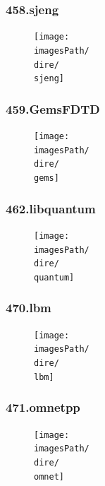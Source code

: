 \documentclass[12pt,a4paper]{article}
\newcommand{\imagesPath}{/home/nick/arch-ntua/ex02/graphs}
\newcommand{\sjeng}{458.sjeng.cslab_branch_predictors.out.pdf}
\newcommand{\gems}{459.GemsFDTD.cslab_branch_predictors.out.pdf}
\newcommand{\quantum}{462.libquantum.cslab_branch_predictors.out.pdf}
\newcommand{\lbm}{470.lbm.cslab_branch_predictors.out.pdf}
\newcommand{\omnet}{471.omnetpp.cslab_branch_predictors.out.pdf}
\newcommand{\dire}{4.5}
\begin{document}
		\subsubsection{458.sjeng}
			\begin{figure}[H]
				\begin{center}
					 \texttt{[image: \\imagesPath/\\dire/\\sjeng]}
				\end{center}
			\end{figure}
		
		\subsubsection{459.GemsFDTD}
			\begin{figure}[H]
				\begin{center}
					 \texttt{[image: \\imagesPath/\\dire/\\gems]}
				\end{center}
			\end{figure}
		
		\subsubsection{462.libquantum}
			\begin{figure}[H]
				\begin{center}
					 \texttt{[image: \\imagesPath/\\dire/\\quantum]}
				\end{center}
			\end{figure}
		
		\subsubsection{470.lbm}
			\begin{figure}[H]
				\begin{center}
					 \texttt{[image: \\imagesPath/\\dire/\\lbm]}
				\end{center}
			\end{figure}
		
		\subsubsection{471.omnetpp}
			\begin{figure}[H]
				\begin{center}
					 \texttt{[image: \\imagesPath/\\dire/\\omnet]}
				\end{center}
			\end{figure}
		
\end{document}
